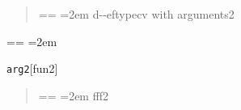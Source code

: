 \documentclass{book}
\makeatletter
\newenvironment{GNUTexinfopreformatted}{%
  \par\obeylines\obeyspaces\frenchspacing
  \parskip=\z@\parindent=\z@}{}
\makeatother
\begin{document}
%
\begin{quote}
\unskip{\parskip=0pt\noindent}%
\begin{GNUTexinfopreformatted}
\leftskip=2em\relax\ttfamily%
d{-}{-}eftypecv with arguments2
\end{GNUTexinfopreformatted}
\end{quote}
\begin{GNUTexinfopreformatted}
\leftskip=2em\relax\ttfamily%

\end{GNUTexinfopreformatted}
\noindent\texttt{arg2}\hfill[fun2]

%
\begin{quote}
\unskip{\parskip=0pt\noindent}%
\begin{GNUTexinfopreformatted}
\leftskip=2em\relax\ttfamily%
fff2
\end{GNUTexinfopreformatted}
\end{quote}
\end{document}
